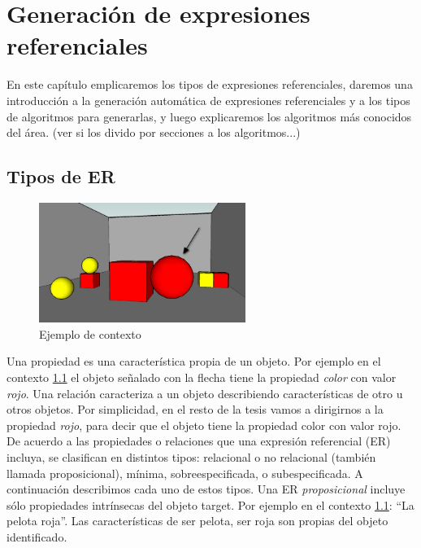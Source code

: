 \chapter{Generaci\'on de expresiones referenciales}
\label{sec:seleccion}

En este cap\'itulo emplicaremos los tipos de expresiones referenciales, daremos una introducci\'on a la generaci\'on autom\'atica de expresiones referenciales y a los tipos de algoritmos para generarlas, y luego explicaremos los algoritmos m\'as conocidos del \'area. (ver si los divido por secciones a los algoritmos...)

\section{Tipos de ER}

\begin{figure}[ht]
\centering
\includegraphics[width=0.6\textwidth]{images/22sinletras.jpg}
\caption{Ejemplo de contexto}
\label{GRE3D7-stimulus}
\end{figure}

Una propiedad es una caracter\'istica propia de un objeto. Por ejemplo en el contexto \ref{GRE3D7-stimulus} el objeto se\~nalado con la flecha tiene la propiedad {\it color} con valor {\it rojo}. Una relaci\'on caracteriza a un objeto describiendo caracter\'isticas de otro u otros objetos. Por simplicidad, en el resto de la tesis vamos a dirigirnos a la propiedad {\it rojo}, para decir que el objeto tiene la propiedad color con valor rojo.\\

De acuerdo a las propiedades o relaciones que una expresi\'on referencial (ER) incluya, se clasifican en distintos tipos: relacional o no relacional (tambi\'en llamada proposicional), m\'inima, sobreespecificada, o subespecificada. A continuaci\'on describimos cada uno de estos tipos.
Una ER {\it proposicional} incluye s\'olo propiedades intr\'insecas del objeto target. Por ejemplo en el contexto \ref{GRE3D7-stimulus}: ``La pelota roja''. Las caracter\'isticas de ser pelota, ser roja son propias del objeto identificado.\\

